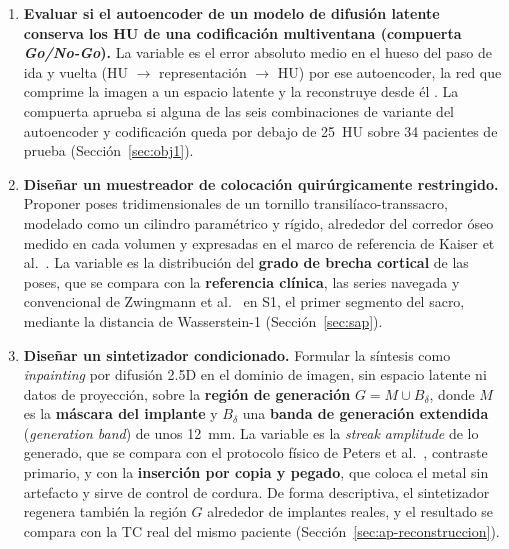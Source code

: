 \begin{enumerate}
    \item \textbf{Evaluar si el autoencoder de un modelo de difusión latente conserva los HU de una codificación multiventana (compuerta \emph{Go/No-Go}).} La variable es el error absoluto medio en el hueso del paso de ida y vuelta (HU $\rightarrow$ representación $\rightarrow$ HU) por ese autoencoder, la red que comprime la imagen a un espacio latente y la reconstruye desde él \cite{rombach2022latentdiffusion}. La compuerta aprueba si alguna de las seis combinaciones de variante del autoencoder y codificación queda por debajo de 25~HU sobre 34 pacientes de prueba (Sección~\ref{sec:obj1}).

    \item \textbf{Diseñar un muestreador de colocación quirúrgicamente restringido.} Proponer poses tridimensionales de un tornillo transilíaco-transsacro, modelado como un cilindro paramétrico y rígido, alrededor del corredor óseo medido en cada volumen y expresadas en el marco de referencia de Kaiser et al.~\cite{kaiser2014dysmorphism}. La variable es la distribución del \textbf{grado de brecha cortical} de las poses, que se compara con la \textbf{referencia clínica}, las series navegada y convencional de Zwingmann et al.~\cite{zwingmann2009navigated} en S1, el primer segmento del sacro, mediante la distancia de Wasserstein-1 (Sección~\ref{sec:sap}).

    \item \textbf{Diseñar un sintetizador condicionado.} Formular la síntesis como \emph{inpainting} por difusión 2.5D en el dominio de imagen, sin espacio latente ni datos de proyección, sobre la \textbf{región de generación} $G = M \cup B_{\delta}$, donde $M$ es la \textbf{máscara del implante} y $B_{\delta}$ una \textbf{banda de generación extendida} (\emph{generation band}) de unos 12~mm. La variable es la \emph{streak amplitude} de lo generado, que se compara con el protocolo físico de Peters et al.~\cite{peters2025hybrid}, contraste primario, y con la \textbf{inserción por copia y pegado}, que coloca el metal sin artefacto y sirve de control de cordura.   De forma descriptiva, el sintetizador regenera también la región $G$ alrededor de implantes reales, y el resultado se compara con la TC real del mismo paciente (Sección~\ref{sec:ap-reconstruccion}).


\end{enumerate}
